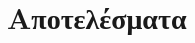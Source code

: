 \documentclass[../main.tex]{subfiles}
\begin{document}
    

\section{Αποτελέσματα}



\clearpage
\end{document}
